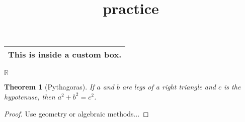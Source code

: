 \documentclass{article}
\title{practice}
\newtheorem{theorem}{Theorem}[section]
\newenvironment{mybox}
 {\begin{center}\begin{tabular}{|p{0.8\textwidth}|} \hline}
 {\\ \hline \end{tabular}\end{center}}
\newcommand{\R}{\mathbb{R}} %
\begin{document}
 \begin{mybox}
 This is inside a custom box.
 \end{mybox}
 $\R$
 \begin{theorem}[Pythagoras]
 If $a$ and $b$ are legs of a right triangle and $c$ is the hypotenuse, then $a^2 + b^2 = c^2$.
 \end{theorem}
 \begin{proof}
 Use geometry or algebraic methods...
 \end{proof}
 
\end{document}
